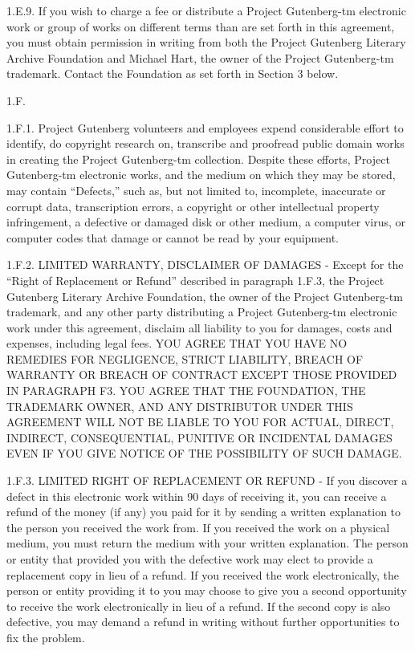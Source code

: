 \documentclass[12pt,oneside]{scrbook}
\begin{document}
  1.E.9. If you wish to charge a fee or distribute a Project Gutenberg-tm
  electronic work or group of works on different terms than are set forth
  in this agreement, you must obtain permission in writing from both the
  Project Gutenberg Literary Archive Foundation and Michael Hart, the
  owner of the Project Gutenberg-tm trademark. Contact the Foundation as
  set forth in Section 3 below.
  
  1.F.
  
  1.F.1. Project Gutenberg volunteers and employees expend considerable
  effort to identify, do copyright research on, transcribe and proofread
  public domain works in creating the Project Gutenberg-tm collection.
  Despite these efforts, Project Gutenberg-tm electronic works, and the
  medium on which they may be stored, may contain ``Defects,'' such as,
  but not limited to, incomplete, inaccurate or corrupt data,
  transcription errors, a copyright or other intellectual property
  infringement, a defective or damaged disk or other medium, a computer
  virus, or computer codes that damage or cannot be read by your
  equipment.
  
  1.F.2. LIMITED WARRANTY, DISCLAIMER OF DAMAGES - Except for the ``Right
  of Replacement or Refund'' described in paragraph 1.F.3, the Project
  Gutenberg Literary Archive Foundation, the owner of the Project
  Gutenberg-tm trademark, and any other party distributing a Project
  Gutenberg-tm electronic work under this agreement, disclaim all
  liability to you for damages, costs and expenses, including legal fees.
  YOU AGREE THAT YOU HAVE NO REMEDIES FOR NEGLIGENCE, STRICT LIABILITY,
  BREACH OF WARRANTY OR BREACH OF CONTRACT EXCEPT THOSE PROVIDED IN
  PARAGRAPH F3. YOU AGREE THAT THE FOUNDATION, THE TRADEMARK OWNER, AND
  ANY DISTRIBUTOR UNDER THIS AGREEMENT WILL NOT BE LIABLE TO YOU FOR
  ACTUAL, DIRECT, INDIRECT, CONSEQUENTIAL, PUNITIVE OR INCIDENTAL DAMAGES
  EVEN IF YOU GIVE NOTICE OF THE POSSIBILITY OF SUCH DAMAGE.
  
  1.F.3. LIMITED RIGHT OF REPLACEMENT OR REFUND - If you discover a defect
  in this electronic work within 90 days of receiving it, you can receive
  a refund of the money (if any) you paid for it by sending a written
  explanation to the person you received the work from. If you received
  the work on a physical medium, you must return the medium with your
  written explanation. The person or entity that provided you with the
  defective work may elect to provide a replacement copy in lieu of a
  refund. If you received the work electronically, the person or entity
  providing it to you may choose to give you a second opportunity to
  receive the work electronically in lieu of a refund. If the second copy
  is also defective, you may demand a refund in writing without further
  opportunities to fix the problem.
  
\end{document}

